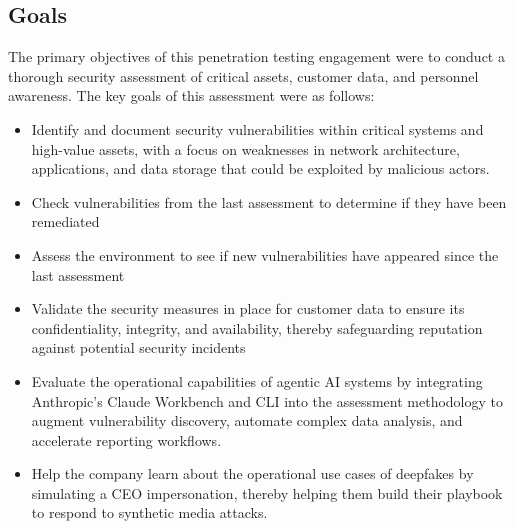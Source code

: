 \subsection{Goals} 
The primary objectives of this penetration testing engagement were to conduct a thorough security assessment of \clientP critical assets, customer data, and personnel awareness. The key goals of this assessment were as follows:

\begin{itemize}
    \item Identify and document security vulnerabilities within critical systems and high-value assets, with a focus on weaknesses in network architecture, applications, and data storage that could be exploited by malicious actors.
    \item Check vulnerabilities from the last assessment to determine if they have been remediated
    \item Assess the environment to see if new vulnerabilities have appeared since the last assessment
    \item Validate the security measures in place for customer data to ensure its confidentiality, integrity, and availability, thereby safeguarding \clientP reputation against potential security incidents
    \item Evaluate the operational capabilities of agentic AI systems by integrating Anthropic's Claude Workbench and CLI into the assessment methodology to augment vulnerability discovery, automate complex data analysis, and accelerate reporting workflows.
   \item Help the company learn about the operational use cases of deepfakes by simulating a CEO impersonation, thereby helping them build their playbook to respond to synthetic media attacks.
\end{itemize}



